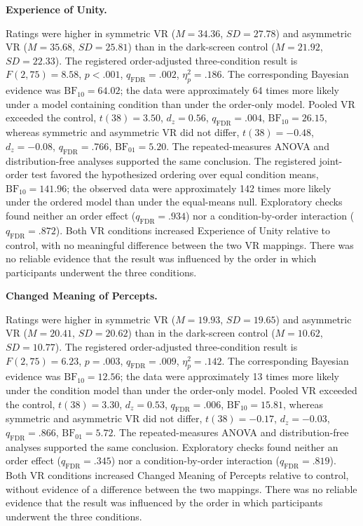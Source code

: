 \documentclass[pdflatex,sn-basic,lineno]{../sn-jnl}
\begin{document}
\medskip\noindent\textbf{Experience of Unity.}\nopagebreak[4]

Ratings were higher in symmetric VR ($M=34.36$, $SD=27.78$) and asymmetric VR ($M=35.68$, $SD=25.81$) than in the dark-screen control ($M=21.92$, $SD=22.33$). The registered order-adjusted three-condition result is $F(2,75)=8.58$, $p<.001$, $q_{\mathrm{FDR}}=.002$, $\eta_p^2=.186$. The corresponding Bayesian evidence was $\mathrm{BF}_{10}=64.02$; the data were approximately 64 times more likely under a model containing condition than under the order-only model. Pooled VR exceeded the control, $t(38)=3.50$, $d_z=0.56$, $q_{\mathrm{FDR}}=.004$, $\mathrm{BF}_{10}=26.15$, whereas symmetric and asymmetric VR did not differ, $t(38)=-0.48$, $d_z=-0.08$, $q_{\mathrm{FDR}}=.766$, $\mathrm{BF}_{01}=5.20$. The repeated-measures ANOVA and distribution-free analyses supported the same conclusion. The registered joint-order test favored the hypothesized ordering over equal condition means, $\mathrm{BF}_{10}=141.96$; the observed data were approximately 142 times more likely under the ordered model than under the equal-means null. Exploratory checks found neither an order effect ($q_{\mathrm{FDR}}=.934$) nor a condition-by-order interaction ($q_{\mathrm{FDR}}=.872$). Both VR conditions increased Experience of Unity relative to control, with no meaningful difference between the two VR mappings. There was no reliable evidence that the result was influenced by the order in which participants underwent the three conditions.

\medskip\noindent\textbf{Changed Meaning of Percepts.}\nopagebreak[4]

Ratings were higher in symmetric VR ($M=19.93$, $SD=19.65$) and asymmetric VR ($M=20.41$, $SD=20.62$) than in the dark-screen control ($M=10.62$, $SD=10.77$). The registered order-adjusted three-condition result is $F(2,75)=6.23$, $p=.003$, $q_{\mathrm{FDR}}=.009$, $\eta_p^2=.142$. The corresponding Bayesian evidence was $\mathrm{BF}_{10}=12.56$; the data were approximately 13 times more likely under the condition model than under the order-only model. Pooled VR exceeded the control, $t(38)=3.30$, $d_z=0.53$, $q_{\mathrm{FDR}}=.006$, $\mathrm{BF}_{10}=15.81$, whereas symmetric and asymmetric VR did not differ, $t(38)=-0.17$, $d_z=-0.03$, $q_{\mathrm{FDR}}=.866$, $\mathrm{BF}_{01}=5.72$. The repeated-measures ANOVA and distribution-free analyses supported the same conclusion. Exploratory checks found neither an order effect ($q_{\mathrm{FDR}}=.345$) nor a condition-by-order interaction ($q_{\mathrm{FDR}}=.819$). Both VR conditions increased Changed Meaning of Percepts relative to control, without evidence of a difference between the two mappings. There was no reliable evidence that the result was influenced by the order in which participants underwent the three conditions.
\end{document}
